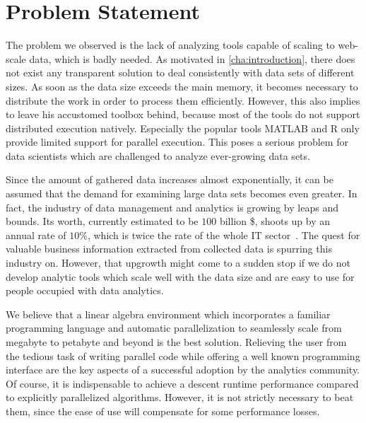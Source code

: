 \chapter{Problem Statement}
\label{cha:problemstatement}


The problem we observed is the lack of analyzing tools capable of scaling to web-scale data, which is badly needed.
As motivated in \cref{cha:introduction}, there does not exist any transparent solution to deal consistently with data sets of different sizes.
As soon as the data size exceeds the main memory, it becomes necessary to distribute the work in order to process them efficiently.
However, this also implies to leave his accustomed toolbox behind, because most of the tools do not support distributed execution natively.
Especially the popular tools MATLAB and R only provide limited support for parallel execution.
This poses a serious problem for data scientists which are challenged to analyze ever-growing data sets.

Since the amount of gathered data increases almost exponentially, it can be assumed that the demand for examining large data sets becomes even greater.
In fact, the industry of data management and analytics is growing by leaps and bounds.
Its worth, currently estimated to be $100$ billion \$, shoots up by an annual rate of $10\%$, which is twice the rate of the whole IT sector~\cite{economist}.
The quest for valuable business information extracted from collected data is spurring this industry on.
However, that upgrowth might come to a sudden stop if we do not develop analytic tools which scale well with the data size and are easy to use for people occupied with data analytics.

We believe that a linear algebra environment which incorporates a familiar programming language and automatic parallelization to seamlessly scale from megabyte to petabyte and beyond is the best solution.
Relieving the user from the tedious task of writing parallel code while offering a well known programming interface are the key aspects of a successful adoption by the analytics community.
Of course, it is indispensable to achieve a descent runtime performance compared to explicitly parallelized algorithms.
However, it is not strictly necessary to beat them, since the ease of use will compensate for some performance losses.

